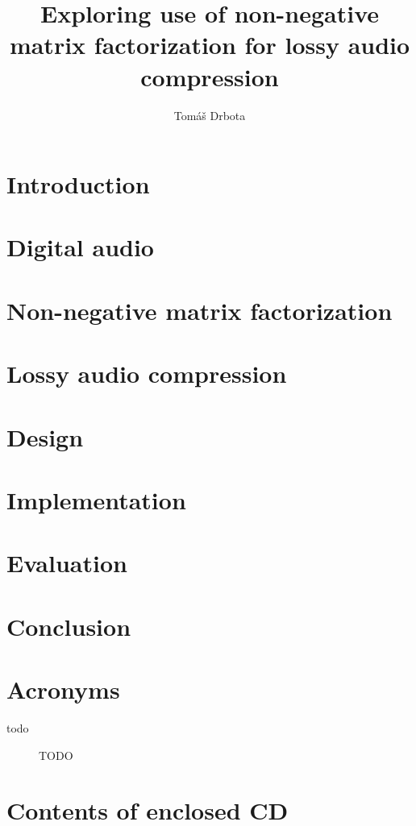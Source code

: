 \documentclass[thesis=M,english,hidelinks]{FITthesis}[2018/03/12]
\title{Exploring use of non-negative matrix factorization for lossy audio compression}
\author{Tomáš Drbota} %
\begin{document}
\chapter{Introduction}


\chapter{Digital audio}


\chapter{Non-negative matrix factorization}


\chapter{Lossy audio compression}


\chapter{Design}


\chapter{Implementation}


\chapter{Evaluation}


\chapter{Conclusion}





\appendix

\chapter{Acronyms}
\begin{description}
	\item[todo] TODO
\end{description}


\chapter{Contents of enclosed CD}
\end{document}
